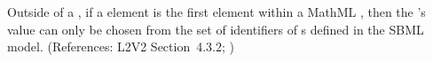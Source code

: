 Outside of a \FunctionDefinition, if a  element is the
first element within a MathML , then the 's
value can only be chosen from the set of identifiers of
\FunctionDefinition{}s defined in the SBML model.
(References: L2V2 Section~4.3.2; )

